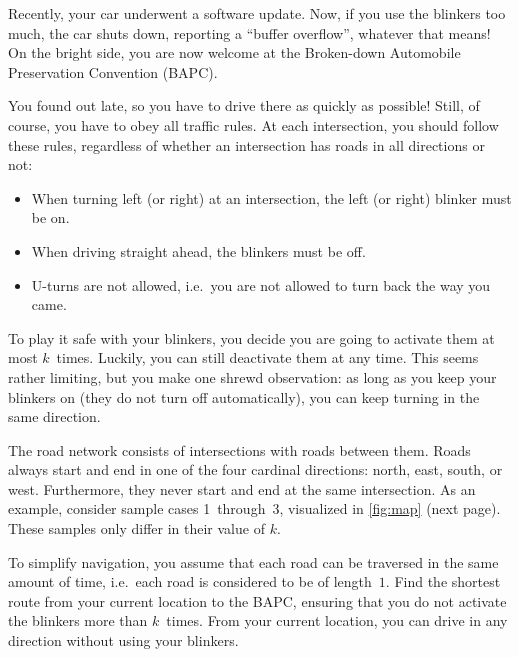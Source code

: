 





Recently, your car underwent a software update. Now, if you use the blinkers too much, the car shuts down, reporting a ``buffer overflow''\!, whatever that means!
On the bright side, you are now welcome at the Broken-down Automobile Preservation Convention (BAPC).

You found out late, so you have to drive there as quickly as possible!
Still, of course, you have to obey all traffic rules.
At each intersection, you should follow these rules, regardless of whether an intersection has roads in all directions or not: \vspace{-\parskip}
\begin{itemize}
    \itemsep0em
    \item When turning left (or right) at an intersection, the left (or right) blinker must be on.
    \item When driving straight ahead, the blinkers must be off.
    \item U-turns are not allowed, i.e.\ you are not allowed to turn back the way you came.
\end{itemize}

To play it safe with your blinkers, you decide you are going to activate them at most $k$~times. Luckily, you can still deactivate them at any time.
This seems rather limiting, but you make one shrewd observation: as long as you keep your blinkers on (they do not turn off automatically), you can keep turning in the same direction. %

The road network consists of intersections with roads between them.
Roads always start and end in one of the four cardinal directions: north, east, south, or west. Furthermore, they never start and end at the same intersection.
As an example, consider sample cases 1~through~3, visualized in \autoref{fig:map} (next page). These samples only differ in their value of $k$.

To simplify navigation, you assume that each road can be traversed in the same amount of time, i.e.\ each road is considered to be of length~$1$. %
Find the shortest route from your current location to the BAPC, ensuring that you do not activate the blinkers more than $k$~times.
From your current location, you can drive in any direction without using your blinkers.

